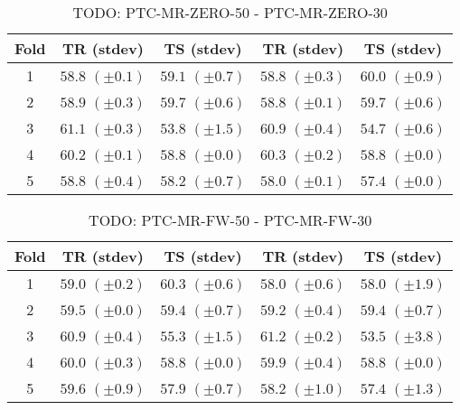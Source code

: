 \documentclass[10pt,a4paper]{book}
\begin{document}
\begin{table}[tbph]
\caption{TODO: PTC-MR-ZERO-50 - PTC-MR-ZERO-30}
\label{TODO}
\centering
\begin{tabular}{c*{4}{c}}
\toprule
Fold & TR (stdev) & TS (stdev) & TR (stdev) & TS (stdev)\\
\midrule
1 & $58.8$ $(\pm 0.1)$ & $59.1$ $(\pm 0.7)$ & $58.8$ $(\pm 0.3)$ & $60.0$ $(\pm 0.9)$\\
2 & $58.9$ $(\pm 0.3)$ & $59.7$ $(\pm 0.6)$ & $58.8$ $(\pm 0.1)$ & $59.7$ $(\pm 0.6)$\\
3 & $61.1$ $(\pm 0.3)$ & $53.8$ $(\pm 1.5)$ & $60.9$ $(\pm 0.4)$ & $54.7$ $(\pm 0.6)$\\
4 & $60.2$ $(\pm 0.1)$ & $58.8$ $(\pm 0.0)$ & $60.3$ $(\pm 0.2)$ & $58.8$ $(\pm 0.0)$\\
5 & $58.8$ $(\pm 0.4)$ & $58.2$ $(\pm 0.7)$ & $58.0$ $(\pm 0.1)$ & $57.4$ $(\pm 0.0)$\\
\bottomrule
\end{tabular}
\end{table}



\begin{table}[tbph]
\caption{TODO: PTC-MR-FW-50 - PTC-MR-FW-30}
\label{TODO}
\centering
\begin{tabular}{c*{4}{c}}
\toprule
Fold & TR (stdev) & TS (stdev) & TR (stdev) & TS (stdev)\\
\midrule
1 & $59.0$ $(\pm 0.2)$ & $60.3$ $(\pm 0.6)$ & $58.0$ $(\pm 0.6)$ & $58.0$ $(\pm 1.9)$\\
2 & $59.5$ $(\pm 0.0)$ & $59.4$ $(\pm 0.7)$ & $59.2$ $(\pm 0.4)$ & $59.4$ $(\pm 0.7)$\\
3 & $60.9$ $(\pm 0.4)$ & $55.3$ $(\pm 1.5)$ & $61.2$ $(\pm 0.2)$ & $53.5$ $(\pm 3.8)$\\
4 & $60.0$ $(\pm 0.3)$ & $58.8$ $(\pm 0.0)$ & $59.9$ $(\pm 0.4)$ & $58.8$ $(\pm 0.0)$\\
5 & $59.6$ $(\pm 0.9)$ & $57.9$ $(\pm 0.7)$ & $58.2$ $(\pm 1.0)$ & $57.4$ $(\pm 1.3)$\\
\bottomrule
\end{tabular}
\end{table}


\end{document}
